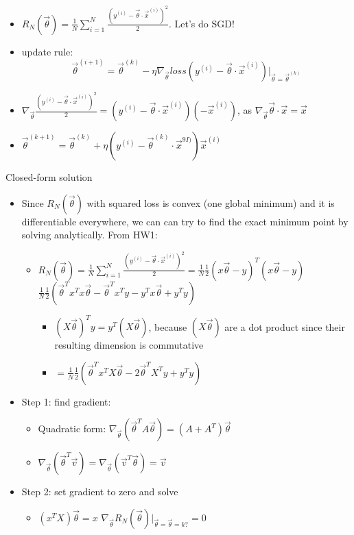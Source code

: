 \documentclass[10pt, oneside]{article}
\begin{document}
\begin{itemize}
\begin{itemize}
        \item $R_N(\vec \theta) = \frac{1}{N} \sum_{i=1}^N \frac{(y^{(i)} - \vec \theta \cdot \vec x^{(i)})^2}{2}$. Let's do SGD!
        \item update rule:\\
        $$\vec \theta ^{(i+1)} = \vec \theta^{(k)} - \eta \nabla_{\vec \theta} loss(y^{(i)} - \vec \theta \cdot \vec x ^{(i)})|_{\vec \theta =\vec \theta^{(k)}}$$
        \item $\nabla_{\vec \theta} \frac{(y^{(i)} - \vec \theta \cdot \vec x^{(i)})^2}{2}=(y^{(i)} - \vec \theta \cdot \vec x^{(i)})(-\vec x^{(i)})$, as $\nabla_{\vec \theta} \vec \theta \cdot \vec x = \vec x$
        \item $\vec \theta ^{(k+1)} = \vec \theta ^{(k)} + \eta (y^{(i)} - \vec \theta ^{(k)} \cdot \vec x^{9I)})\vec x^{(i)}$
    \end{itemize}
\end{itemize}

Closed-form solution
\begin{itemize}
    \item Since $R_N(\vec \theta)$ with squared loss is convex (one global minimum) and it is differentiable everywhere, we can can try to find the exact minimum point by solving analytically.  
    From HW1:
    \begin{itemize}
        \item $R_N(\vec \theta) = \frac{1}{N}\sum_{i=1} ^N \frac{(y^{(i)} - \vec \theta \cdot \vec x^{(i)})^2}{2} = \frac{1}{N} \frac{1}{2} (x\vec \theta -y)^T (x\vec \theta -y)$\\
        $\frac{1}{N}\frac{1}{2}(\vec \theta ^T x^T x\vec \theta - \vec \theta^T x^Ty -y^Tx\vec \theta +y^Ty)$
        \begin{itemize}
            \item $(X\vec \theta)^Ty = y^T(X\vec \theta)$, because $(X\vec\theta)$ are a dot product since their resulting dimension is commutative
            \item $=\frac{1}{N}\frac{1}{2}(\vec \theta^T x^T X\vec \theta - 2\vec \theta^TX^Ty+y^Ty)$
        \end{itemize}
    \end{itemize}
    \item Step 1: find gradient:
    \begin{itemize}
        \item Quadratic form: $\nabla_{\vec \theta} (\vec \theta^T A\vec \theta)=(A+A^T)\vec \theta$
        \item $\nabla_{\vec \theta} (\vec \theta^T \vec v) = \nabla_{\vec \theta}(\vec v^T \vec \theta) = \vec v$
    \end{itemize}
    \item Step 2: set gradient to zero and solve
    \begin{itemize}
        \item $(x^TX)\vec \theta = x$
        $\nabla_{\vec \theta} R_N (\vec \theta)|_{\vec \theta =\vec \theta =k?} = 0$
    \end{itemize}
\end{itemize}
\end{document}
